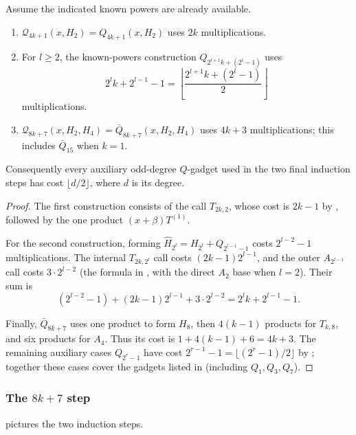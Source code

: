 \begin{lemma}
\label{lem:odd-gadgets-count}
    Assume the indicated known powers are already available.
    \begin{enumerate}
      \item $\mathcal Q_{4k+1}(x,H_2)=Q_{4k+1}(x,H_2)$ uses $2k$
      multiplications.
      \item For $l\ge2$, the known-powers construction
      $Q_{2^{l+1}k+(2^l-1)}$ uses
      \[
        2^l k+2^{l-1}-1
        =\left\lfloor\frac{2^{l+1}k+(2^l-1)}2\right\rfloor
      \]
      multiplications.
      \item $\mathcal Q_{8k+7}(x,H_2,H_4)=\bar Q_{8k+7}(x,H_2,H_4)$ uses
      $4k+3$ multiplications; this includes $\bar Q_{15}$ when $k=1$.
    \end{enumerate}
    Consequently every auxiliary odd-degree $Q$-gadget used in the two final
    induction steps has cost $\lfloor d/2\rfloor$, where $d$ is its degree.
\end{lemma}
\begin{proof}
    The first construction consists of the call $T_{2k,2}$, whose cost is
    $2k-1$ by , followed by the one product
    $(x+\beta)T^{(1)}$.

    For the second construction, forming
    $\hat H_{2^l}=H_{2^l}+Q_{2^{l-1}-1}$ costs
    $2^{l-2}-1$ multiplications.  The internal $T_{2k,2^l}$ call costs
    $(2k-1)2^{l-1}$, and the outer $A_{2^{l-1}}$ call costs
    $3\cdot2^{l-2}$ (the formula in , with the direct
    $A_2$ base when $l=2$).  Their sum is
    \[
      (2^{l-2}-1)+(2k-1)2^{l-1}+3\cdot2^{l-2}
      =2^lk+2^{l-1}-1.
    \]

    Finally, $\bar Q_{8k+7}$ uses one product to form $H_8$, then
    $4(k-1)$ products for $T_{k,8}$, and six products for $A_4$.  Thus its
    cost is $1+4(k-1)+6=4k+3$.  The remaining auxiliary cases
    $Q_{2^r-1}$ have cost $2^{r-1}-1=\lfloor(2^r-1)/2\rfloor$ by
    ; together these cases cover the gadgets listed in
     (including $Q_1,Q_3,Q_7$).
\end{proof}

\subsubsection{The \texorpdfstring{$8k+7$}{8k+7} step}

 pictures the two induction steps.

